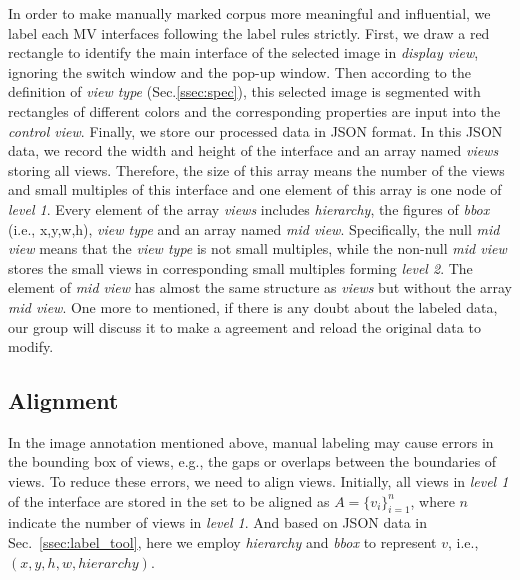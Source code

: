 In order to make manually marked corpus more meaningful and influential, we label each MV interfaces following the label rules strictly.
First, we draw a red rectangle to identify the main interface of the selected image in \textit{display view}, ignoring the switch window and the pop-up window.
Then according to the definition of \textit{view type} (Sec.\ref{ssec:spec}), this selected image is segmented with rectangles of different colors and the corresponding properties are input into the \textit{control view}. 
Finally, we store our processed data in JSON format. 
In this JSON data, we record the width and height of the interface and an array named \textit{views} storing all views. 
Therefore, the size of this array means the number of the views and small multiples of this interface and one element of this array is one node of \textit{level 1}.
Every element of the array \textit{views} includes \textit{hierarchy}, the figures of \textit{bbox} (i.e., x,y,w,h), \textit{view type} and an array named \textit{mid view}.
Specifically, the null \textit{mid view} means that the \textit{view type} is not small multiples, while the non-null \textit{mid view} stores the small views in corresponding small multiples forming \textit{level 2}. 
The element of \textit{mid view} has almost the same structure as \textit{views} but without the array \textit{mid view}.
One more to mentioned, if there is any doubt about the labeled data, our group will discuss it to make a agreement and reload the original data to modify.


\subsection{Alignment}
\label{ssec:alignment}
In the image annotation mentioned above, manual labeling may cause errors in the bounding box of views, e.g., the gaps or overlaps between the boundaries of views.
To reduce these errors, we need to align views. 
Initially, all views in \textit{level 1} of the interface are stored in the set to be aligned as $A= \{v_{i}\}_{i=1}^n$, where $n$ indicate the number of views in \textit{level 1}.
And based on JSON data in Sec.~\ref{ssec:label_tool}, here we employ \textit{hierarchy} and \textit{bbox} to represent $v$, i.e.,$(x, y, h, w, hierarchy)$.

